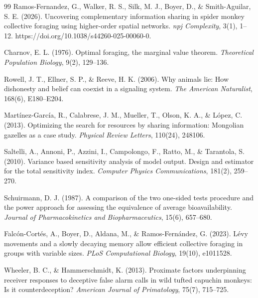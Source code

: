 \documentclass[11pt,a4paper]{report}
\begin{document}
\begin{thebibliography}{99}
 Ramos-Fernandez, G., Walker, R. S., Silk, M. J., Boyer, D., \& Smith-Aguilar, S. E. (2026). Uncovering complementary information sharing in spider monkey collective foraging using higher-order spatial networks. \textit{npj Complexity}, 3(1), 1--12. https://doi.org/10.1038/s44260-025-00060-0.

 Charnov, E. L. (1976). Optimal foraging, the marginal value theorem. \textit{Theoretical Population Biology}, 9(2), 129--136.

 Rowell, J. T., Ellner, S. P., \& Reeve, H. K. (2006). Why animals lie: How dishonesty and belief can coexist in a signaling system. \textit{The American Naturalist}, 168(6), E180--E204.

 Martínez-García, R., Calabrese, J. M., Mueller, T., Olson, K. A., \& López, C. (2013). Optimizing the search for resources by sharing information: Mongolian gazelles as a case study. \textit{Physical Review Letters}, 110(24), 248106.

 Saltelli, A., Annoni, P., Azzini, I., Campolongo, F., Ratto, M., \& Tarantola, S. (2010). Variance based sensitivity analysis of model output. Design and estimator for the total sensitivity index. \textit{Computer Physics Communications}, 181(2), 259--270.

 Schuirmann, D. J. (1987). A comparison of the two one-sided tests procedure and the power approach for assessing the equivalence of average bioavailability. \textit{Journal of Pharmacokinetics and Biopharmaceutics}, 15(6), 657--680.

 Falcón-Cortés, A., Boyer, D., Aldana, M., \& Ramos-Fernández, G. (2023). Lévy movements and a slowly decaying memory allow efficient collective foraging in groups with variable sizes. \textit{PLoS Computational Biology}, 19(10), e1011528.

 Wheeler, B. C., \& Hammerschmidt, K. (2013). Proximate factors underpinning receiver responses to deceptive false alarm calls in wild tufted capuchin monkeys: Is it counterdeception? \textit{American Journal of Primatology}, 75(7), 715--725.
\end{thebibliography}

\appendix
\FloatBarrier
\end{document}
